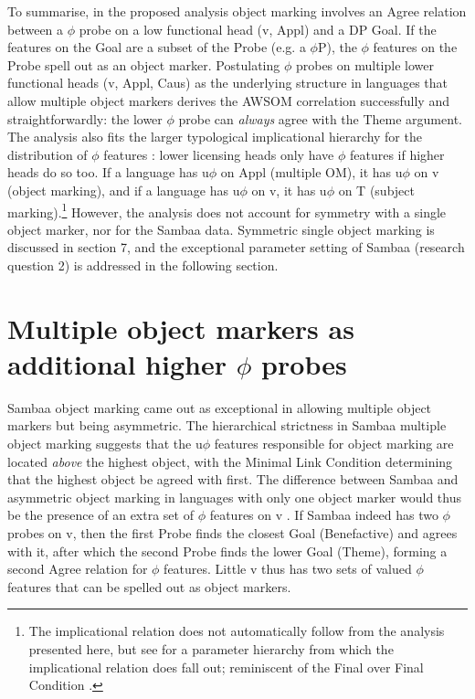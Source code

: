 \documentclass[output=paper
,modfonts
,nonflat]{langsci/langscibook}
\begin{document}
To summarise, in the proposed analysis object marking involves an Agree relation between a $\phi$ probe on a low functional head (v, Appl) and a DP Goal. If the features on the Goal are a subset of the Probe (e.g. a $\phi$P), the $\phi$ features on the Probe spell out as an object marker. Postulating $\phi$ probes on multiple lower functional heads (v, Appl, Caus) as the underlying structure in languages that allow multiple object markers derives the AWSOM correlation successfully and straightforwardly: the lower $\phi$ probe can \textit{always} agree with the Theme argument. The analysis also fits the larger typological implicational hierarchy for the distribution of $\phi$ features \citep{Moravcsik1974, Givón1976}: lower licensing heads only have $\phi$ features if higher heads do so too. If a language has u$\phi$ on Appl (multiple OM), it has u$\phi$ on v (object marking), and if a language has u$\phi$ on v, it has u$\phi$ on T (subject marking).\footnote{The implicational relation does not automatically follow from the analysis presented here, but see \citet{Van_der_WalTA} for a parameter hierarchy from which the implicational relation does fall out; reminiscent of the Final over Final Condition \citep{Sheehan_et_al2017}.} However, the analysis does not account for symmetry with a single object marker, nor for the Sambaa data. Symmetric single object marking is discussed in section 7, and the exceptional parameter setting of Sambaa (research question 2) is addressed in the following section. 

\section{Multiple object markers as additional higher $\phi$ probes}

Sambaa object marking came out as exceptional in allowing multiple object markers but being asymmetric. The hierarchical strictness in Sambaa multiple object marking suggests that the u$\phi$ features responsible for object marking are located \textit{above} the highest object, with the Minimal Link Condition determining that the highest object be agreed with first. The difference between Sambaa and asymmetric object marking in languages with only one object marker would thus be the presence of an extra set of $\phi$ features on v \citep{Adams2010}. If Sambaa indeed has two $\phi$ probes on v, then the first Probe finds the closest Goal (Benefactive) and agrees with it, after which the second Probe finds the lower Goal (Theme), forming a second Agree relation for $\phi$ features. Little v thus has two sets of valued $\phi$ features that can be spelled out as object markers.
\end{document}
